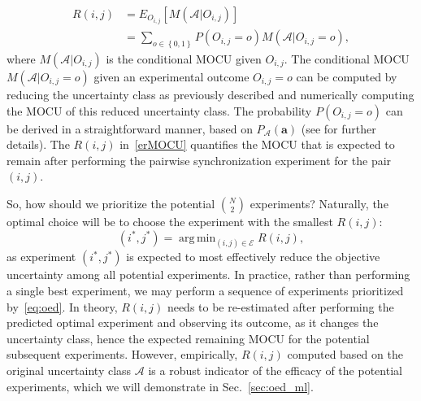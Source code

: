 \documentclass{article}
\DeclareMathOperator*{\argmin}{arg\,min}
\newcommand{\be}{\begin{equation}}
\newcommand{\ee}{\end{equation}}
\begin{document}
\begin{equation}
\begin{split}
R\left(i, j\right) &= E_{O_{i, j}}[M\left(\mathbf{\mathcal{A}} | O_{i, j}\right)]\\
&=\sum_{o \in \left\{ 0, 1\right\}} P\left(O_{i, j} = o\right) M\left(\mathbf{\mathcal{A}} | O_{i, j} = o \right),\label{erMOCU}
\end{split}
\end{equation}
where $M\left(\mathbf{\mathcal{A}} | O_{i, j}\right)$ is the conditional MOCU given $O_{i, j}$. The conditional MOCU $M\left(\mathbf{\mathcal{A}} | O_{i, j} = o \right)$ given an experimental outcome $O_{i, j} = o$ can be computed by reducing the uncertainty class as previously described and numerically computing the MOCU of this reduced uncertainty class. The probability $P\left(O_{i, j} = o\right)$ can be derived in a straightforward manner, based on ${P_{\mathbf{\mathcal{A}}}\left( \mathbf{a} \right)}$ (see \cite{Hong2021} for further details). The ${R\left(i, j\right)}$ in~\eqref{erMOCU} quantifies the MOCU that is expected to remain after performing the pairwise synchronization experiment for the pair $\left(i,j\right)$.

So, how should we prioritize the potential $N \choose 2$ experiments? Naturally, the optimal choice will be to choose the experiment with the smallest ${R\left(i, j\right)}$:
\be
    \left(i^\ast, j^\ast\right)=\argmin_{\left(i,j\right)\in\mathbf{\mathcal{E}}} R\left(i,j\right), \label{eq:oed}
\ee
as experiment $\left(i^*,j^*\right)$ is expected to most effectively reduce the objective uncertainty among all potential experiments. In practice, rather than performing a single best experiment, we may perform a sequence of experiments prioritized by~\eqref{eq:oed}. In theory, $R\left(i,j\right)$ needs to be re-estimated after performing the predicted optimal experiment and observing its outcome, as it changes the uncertainty class, hence the expected remaining MOCU for the potential subsequent experiments. However, empirically, $R\left(i,j\right)$ computed based on the original uncertainty class $\mathbf{\mathcal{A}}$ is a robust indicator of the efficacy of the potential experiments, which we will demonstrate in Sec.~\ref{sec:oed_ml}.
\end{document}
